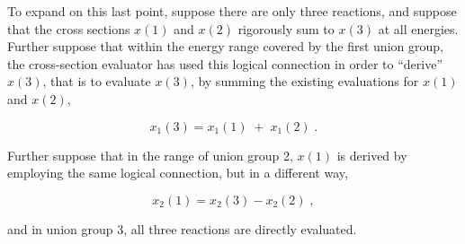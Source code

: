 To expand on this last point, suppose there are only three reactions,
and suppose that the cross sections $x(1)$ and $x(2)$ rigorously sum to
$x(3)$ at all energies.  Further suppose that within the
energy range {\rm cov}ered by the first union group, the cross-section
evaluator has used this logical connection in order to ``derive''
$x(3)$, that is to evaluate $x(3)$, by summing the existing evaluations
for $x(1)$ and $x(2)$,

\begin{equation}
x_1(3) = x_1(1)\;+\;x_1(2)\;.
\end{equation}

\noindent
Further suppose that in the range of union group 2, $x(1)$ is derived by
employing the same logical connection, but in a different way,

\begin{equation}
x_2(1) = x_2(3)-x_2(2)\;,
\end{equation}

\noindent
and in union group 3, all three reactions are directly evaluated.

